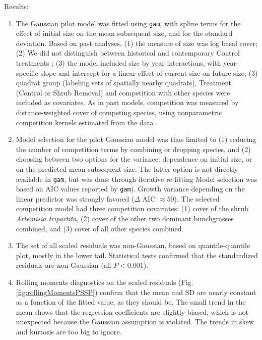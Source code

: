 \documentclass[11pt]{article}
\begin{document}
{Results: \begin{enumerate}

\item The Gaussian pilot model was fitted using \texttt{gam}, with spline terms for the effect of initial size on the
mean subsequent size, and for the standard deviation. Based on past analyses, (1) the measure of size was log basal cover; 
(2) We did not distinguish between historical and contemporary Control treatments \citep{Adler-2018}; (3) the model 
included size by year interactions, with year-specific slope and intercept for a linear effect of current size on
future size; (3) quadrat group (labeling sets of spatially nearby quadrats), Treatment (Control or Shrub Removal) and 
competition with other species were included as covariates. As in past models, competition was measured by distance-weighted 
cover of competing species, using nonparametric competition kernels estimated from the data \citep{Teller-2016}. 

\item Model selection for the pilot Gaussian model was thus limited to (1) reducing the number of competition
terms by combining or dropping species, and (2) choosing between two options for the variance: dependence on 
initial size, or on the predicted mean subsequent size. The latter option is not directly available in \texttt{gam}, but was done
through iterative re-fitting Model selection was based on AIC values reported by \texttt{gam}). Growth variance depending on
the linear predictor was strongly favored ($\Delta$ AIC $\approx 50$). The selected competition model had  
three competition covariates: (1) cover of the shrub \emph{Artemisia tripartita}, (2) cover of the other two dominant 
bunchgrasses combined, and (3) cover of all other species combined. 

\item The set of all scaled residuals was non-Gaussian, based on quantile-quantile plot, mostly in the lower tail. Statistical tests
confirmed that the standardized residuals are non-Gaussian (all $P<0.001$). 

\item Rolling moments diagnostics on the scaled residuals (Fig. \ref{fig:rollingMomentsPSSP}) confirm that the mean 
and SD are nearly constant as a function of the fitted value, as they should be. The small trend in the mean shows that the 
regression coefficients are slightly biased, which is not unexpected because the Gaussian assumption is violated. 
The trends in skew and kurtosis are too big to ignore.  


\end{enumerate}}
\end{document}
